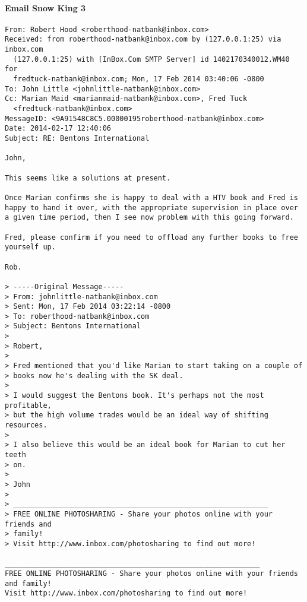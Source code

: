 \paragraph{Email Snow King 3}
\label{SnowKing3}
\begin{verbatim}
From: Robert Hood <roberthood-natbank@inbox.com>
Received: from roberthood-natbank@inbox.com by (127.0.0.1:25) via inbox.com
  (127.0.0.1:25) with [InBox.Com SMTP Server] id 1402170340012.WM40 for
  fredtuck-natbank@inbox.com; Mon, 17 Feb 2014 03:40:06 -0800
To: John Little <johnlittle-natbank@inbox.com>
Cc: Marian Maid <marianmaid-natbank@inbox.com>, Fred Tuck
  <fredtuck-natbank@inbox.com>
MessageID: <9A91548C8C5.00000195roberthood-natbank@inbox.com>
Date: 2014-02-17 12:40:06
Subject: RE: Bentons International

John,

This seems like a solutions at present. 

Once Marian confirms she is happy to deal with a HTV book and Fred is happy to hand it over, with the appropriate supervision in place over a given time period, then I see now problem with this going forward.

Fred, please confirm if you need to offload any further books to free yourself up.

Rob.

> -----Original Message-----
> From: johnlittle-natbank@inbox.com
> Sent: Mon, 17 Feb 2014 03:22:14 -0800
> To: roberthood-natbank@inbox.com
> Subject: Bentons International
> 
> Robert,
> 
> Fred mentioned that you'd like Marian to start taking on a couple of
> books now he's dealing with the SK deal.
> 
> I would suggest the Bentons book. It's perhaps not the most profitable,
> but the high volume trades would be an ideal way of shifting resources.
> 
> I also believe this would be an ideal book for Marian to cut her teeth
> on.
> 
> John
> 
> ____________________________________________________________
> FREE ONLINE PHOTOSHARING - Share your photos online with your friends and
> family!
> Visit http://www.inbox.com/photosharing to find out more!

____________________________________________________________
FREE ONLINE PHOTOSHARING - Share your photos online with your friends and family!
Visit http://www.inbox.com/photosharing to find out more!


\end{verbatim}


